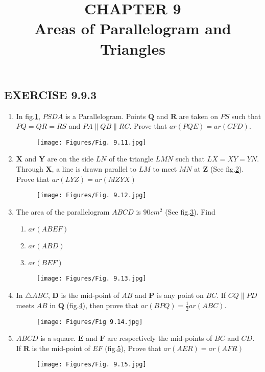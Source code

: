 \documentclass{article}
\let\vec\mathbf{}
\begin{document}
\begin{center}
\title{CHAPTER 9\\Areas of Parallelogram and Triangles}
\date{}
\maketitle
\section{EXERCISE 9.9.3}     
\end{center}
\begin{enumerate}
\item In fig.\ref{Fig.9.11}, $PSDA$ is a Parallelogram. Points $\vec{Q}$ and $\vec{R}$ are taken on $PS$ such that $PQ = QR = RS$ and $PA \parallel QB \parallel RC$. Prove that $ar (PQE) = ar (CFD)$.
\begin{figure}[h]
	\centering
	\texttt{[image: Figures/Fig. 9.11.jpg]}
	\caption{}
	\label{Fig.9.11}
\end{figure}
\item $\vec{X}$ and $\vec{Y}$ are on the side $LN$ of the triangle $LMN$ such that $LX = XY = YN$. Through $\vec{X}$, a line is drawn parallel to $LM$ to meet $MN$ at $\vec{Z}$ (See fig.\ref{Fig.9.12}). Prove that $ar (LYZ) = ar (MZYX)$
\begin{figure}[h]
	\centering
	\texttt{[image: Figures/Fig. 9.12.jpg]}
	\caption{}
	\label{Fig.9.12}
\end{figure}
\item The area of the parallelogram $ABCD$ is $90cm^2$ (See fig.\ref{Fig.9.13}). Find
\begin{enumerate}
\item $ar (ABEF)$
\item $ar (ABD)$
\item $ar (BEF)$
\end{enumerate}
\begin{figure}[h]
          \centering{}
	  \texttt{[image: Figures/Fig. 9.13.jpg]}
	  \caption{}
	  \label{Fig.9.13}
\end{figure}
\item In $ \triangle ABC $, $\vec{D}$ is the mid-point of $AB$ and $\vec{P}$ is any point on $BC$. If $CQ \parallel PD$ meets $AB$ in $\vec{Q}$ (fig.\ref{Fig.9.14}), then prove that $ar (BPQ) = \frac{1}{2} ar(ABC).$
\begin{figure}[h]
	 \centering
	 \texttt{[image: Figures/Fig 9.14.jpg]}
	 \caption{}
	 \label{Fig.9.14}
\end{figure}
\item $ABCD$ is a square. $\vec{E}$ and $\vec{F}$ are respectively the mid-points of $BC$ and $CD$. If $\vec{R}$ is the mid-point of $EF$ (fig.\ref{Fig.9.15}), Prove that $ar (AER) = ar(AFR)$
\begin{figure}[h]	
	\centering
	\texttt{[image: Figures/Fig. 9.15.jpg]}
	\caption{}
	\label{Fig.9.15}
\end{figure}
\end{enumerate}
\end{document}
